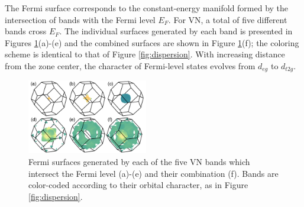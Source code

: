 \documentclass[twocolumn,showpacs,preprintnumbers,superscriptaddress,prb,floatfix,aps,10pt]{revtex4-1}
\begin{document}
The Fermi surface corresponds to the constant-energy manifold formed by the intersection of bands with the Fermi level $E_F$. For VN, a total of five different bands cross $E_F$. The individual surfaces generated by each band is presented in Figures \ref{fig:fermi_surface}(a)-(e) and the combined surfaces are shown in Figure \ref{fig:fermi_surface}(f); the coloring scheme is identical to that of Figure \ref{fig:dispersion}. With increasing distance from the zone center, the character of Fermi-level states evolves from $d_{eg}$ to $d_{t2g}$. 
%
\begin{figure}[h]
\includegraphics[width=0.47\textwidth]{Figure_2_fermi_surface.png}
\caption{\label{fig:fermi_surface} Fermi surfaces  generated by each of the five VN bands which intersect the Fermi level (a)-(e) and their combination (f). Bands are color-coded according to their orbital character, as in Figure \ref{fig:dispersion}.}
\end{figure}
\end{document}
